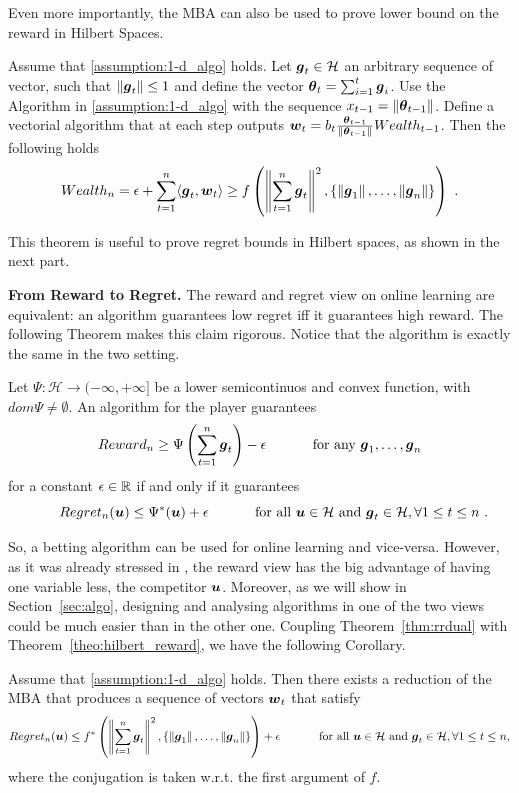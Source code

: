 Even more importantly, the \ac{MBA} can also be used to prove lower bound on the reward in Hilbert Spaces.
\begin{theorem}
\label{theo:hilbert_reward}
  Assume that \ref{assumption:1-d_algo} holds.
  Let $\boldsymbol{g}_t \in \mathcal{H}$ an arbitrary sequence of vector, such that $\left\|{\boldsymbol{g}_t}\right\| \leq 1$ and define the vector ${\boldsymbol{\theta}}_t=\sum_{i=1}^{t} \boldsymbol{g}_i$.
  Use the Algorithm in \ref{assumption:1-d_algo} with the sequence $x_{t-1}= \left\|{{\boldsymbol{\theta}}_{t-1}}\right\|$.
  Define a vectorial algorithm that at each step outputs $\boldsymbol{w}_t = b_t \frac{{\boldsymbol{\theta}}_{t-1}}{\left\|{{\boldsymbol{\theta}}_{t-1}}\right\|} Wealth_{t-1}$. Then the following holds
  \[
  Wealth_{n} = \epsilon + \sum_{t=1}^n \langle \boldsymbol{g}_t, \boldsymbol{w}_t \rangle \geq f\left( \left\|{\sum_{t=1}^n \boldsymbol{g}_t}\right\|^2, \left\{\left\|{\boldsymbol{g}_1}\right\|, \ldots, \left\|{\boldsymbol{g}_n}\right\|\right\}\right)~.
  \]
\end{theorem}
This theorem is useful to prove regret bounds in Hilbert spaces, as shown in the next part.

\vspace{0.2cm}\noindent\textbf{From Reward to Regret.}
The reward and regret view on online learning are equivalent: an algorithm guarantees low regret iff it guarantees high reward. The following Theorem makes this claim rigorous. Notice that the algorithm is exactly the same in the two setting.
\begin{theorem}
  \label{thm:rrdual}
  Let $\Psi:\mathcal{H} \rightarrow (-\infty, +\infty]$ be a lower semicontinuos and convex function, with $dom \Psi \neq \emptyset$. An
  algorithm for the player guarantees
  \[
  Reward_n \geq \Psi\left(\sum_{t=1}^n \boldsymbol{g}_t\right) - \epsilon \quad \quad \quad \textnormal{ for any } \boldsymbol{g}_1, \dots, \boldsymbol{g}_n
  \]
  for a constant $\epsilon \in \mathbb{R}$ if and only if it
  guarantees
  \begin{equation}\label{eq:regb}
  \qquad Regret_n(\boldsymbol{u}) \leq \Psi^*(\boldsymbol{u}) + \epsilon \quad \quad \quad \textnormal{ for all } \boldsymbol{u} \in \mathcal{H} \textnormal{ and } \boldsymbol{g}_t \in \mathcal{H}, \forall 1\leq t\leq n~.
  \end{equation}
\end{theorem}
So, a betting algorithm can be used for online learning and vice-versa. However, as it was already stressed in \citet{McMahanO14}, the reward view has the big advantage of having one variable less, the competitor $\boldsymbol{u}$.
Moreover, as we will show in Section~\ref{sec:algo}, designing and analysing algorithms in one of the two views could be much easier than in the other one.
Coupling Theorem~\ref{thm:rrdual} with Theorem~\ref{theo:hilbert_reward}, we have the following Corollary.
\begin{cor}
\label{theo:hilbert_regret}
Assume that \ref{assumption:1-d_algo} holds. Then there exists a reduction of the \ac{MBA} that produces a sequence of vectors $\boldsymbol{w}_t$ that satisfy
\[
Regret_n(\boldsymbol{u}) \leq f^*\left( \left\|{\sum_{t=1}^{n} \boldsymbol{g}_t}\right\|^2, \left\{\left\|{\boldsymbol{g}_1}\right\|, \ldots, \left\|{\boldsymbol{g}_n}\right\|\right\}\right)+\epsilon \quad \quad \quad \textnormal{ for all } \boldsymbol{u} \in \mathcal{H} \textnormal{ and } \boldsymbol{g}_t \in \mathcal{H}, \forall 1\leq t\leq n,
\]
where the conjugation is taken w.r.t. the first argument of $f$.
\end{cor}

